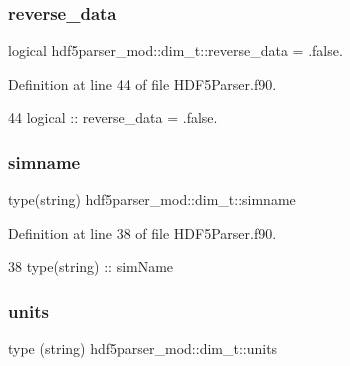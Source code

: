 \subsubsection{\texorpdfstring{reverse\+\_\+data}{reverse\_data}}
{\footnotesize\ttfamily logical hdf5parser\+\_\+mod\+::dim\+\_\+t\+::reverse\+\_\+data = .false.\hspace{0.3cm}{\ttfamily [private]}}



Definition at line 44 of file H\+D\+F5\+Parser.\+f90.


\begin{DoxyCode}
44         \textcolor{keywordtype}{logical} :: reverse\_data = .false.
\end{DoxyCode}
\mbox{\label{structhdf5parser__mod_1_1dim__t_aeb6fdf1f04e170d43fbc722d4ae59506}} 
\subsubsection{\texorpdfstring{simname}{simname}}
{\footnotesize\ttfamily type(string) hdf5parser\+\_\+mod\+::dim\+\_\+t\+::simname\hspace{0.3cm}{\ttfamily [private]}}



Definition at line 38 of file H\+D\+F5\+Parser.\+f90.


\begin{DoxyCode}
38         \textcolor{keywordtype}{type}(string) :: simName
\end{DoxyCode}
\mbox{\label{structhdf5parser__mod_1_1dim__t_a8377ba017999543e0e88e8150b52bbcd}} 
\subsubsection{\texorpdfstring{units}{units}}
{\footnotesize\ttfamily type (string) hdf5parser\+\_\+mod\+::dim\+\_\+t\+::units\hspace{0.3cm}{\ttfamily [private]}}



